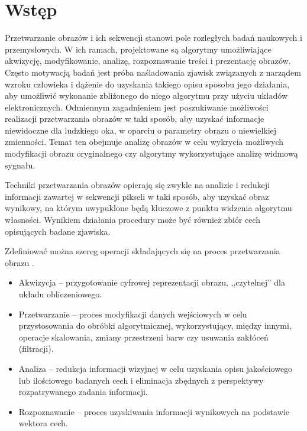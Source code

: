 \chapter{Wstęp}
\label{cha:intruduction}


Przetwarzanie obrazów i ich sekwencji stanowi pole rozległych badań naukowych i przemysłowych.
W ich ramach, projektowane są algorytmy umożliwiające akwizycję, modyfikowanie, analizę, rozpoznawanie treści i prezentację obrazów.
Często motywacją badań jest próba naśladowania zjawisk związanych z narządem wzroku człowieka i dążenie do uzyskania takiego opisu sposobu jego działania, aby umożliwić wykonanie zbliżonego do niego algorytmu przy użyciu układów elektronicznych. 
Odmiennym zagadnieniem jest poszukiwanie możliwości realizacji przetwarzania obrazów w taki sposób, aby uzyskać informacje niewidoczne dla ludzkiego oka, w oparciu o parametry obrazu o niewielkiej zmienności. Temat ten obejmuje analizę obrazów w celu wykrycia możliwych modyfikacji obrazu oryginalnego czy algorytmy wykorzystujące analizę widmową sygnału. %

Techniki przetwarzania obrazów opierają się zwykle na analizie i redukcji informacji zawartej w sekwencji pikseli w taki sposób, aby uzyskać obraz wynikowy, na którym uwypuklone będą kluczowe z punktu widzenia algorytmu własności.
Wynikiem działania procedury może być również zbiór cech opisujących badane zjawiska.

Zdefiniować można szereg operacji składających się na proces przetwarzania obrazu \cite{Tadeusiewicz1997}.
\begin{itemize}
	\item Akwizycja -- przygotowanie cyfrowej reprezentacji obrazu, ,,czytelnej'' dla układu obliczeniowego.
	
	\item Przetwarzanie -- proces modyfikacji danych wejściowych w celu przystosowania do obróbki algorytmicznej, wykorzystujący, między innymi, operacje skalowania, zmiany przestrzeni barw czy usuwania zakłóceń (filtracji).
	
	\item Analiza -- redukcja informacji wizyjnej w celu uzyskania opisu jakościowego lub ilościowego badanych cech i eliminacja zbędnych z perspektywy rozpatrywanego zadania informacji.
	
	\item Rozpoznawanie -- proces uzyskiwania informacji wynikowych na podstawie wektora cech.
\end{itemize}

